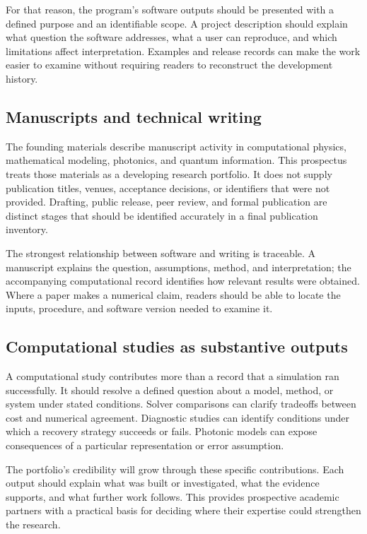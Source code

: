\documentclass[10pt,letterpaper]{article}
\begin{document}
For that reason, the program's software outputs should be presented with a defined purpose and an identifiable scope. A project description should explain what question the software addresses, what a user can reproduce, and which limitations affect interpretation. Examples and release records can make the work easier to examine without requiring readers to reconstruct the development history.

\subsection{Manuscripts and technical writing}
The founding materials describe manuscript activity in computational physics, mathematical modeling, photonics, and quantum information. This prospectus treats those materials as a developing research portfolio. It does not supply publication titles, venues, acceptance decisions, or identifiers that were not provided. Drafting, public release, peer review, and formal publication are distinct stages that should be identified accurately in a final publication inventory.

The strongest relationship between software and writing is traceable. A manuscript explains the question, assumptions, method, and interpretation; the accompanying computational record identifies how relevant results were obtained. Where a paper makes a numerical claim, readers should be able to locate the inputs, procedure, and software version needed to examine it.

\subsection{Computational studies as substantive outputs}
A computational study contributes more than a record that a simulation ran successfully. It should resolve a defined question about a model, method, or system under stated conditions. Solver comparisons can clarify tradeoffs between cost and numerical agreement. Diagnostic studies can identify conditions under which a recovery strategy succeeds or fails. Photonic models can expose consequences of a particular representation or error assumption.

The portfolio's credibility will grow through these specific contributions. Each output should explain what was built or investigated, what the evidence supports, and what further work follows. This provides prospective academic partners with a practical basis for deciding where their expertise could strengthen the research.
\end{document}
